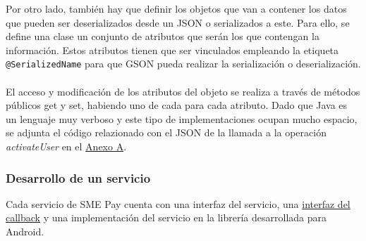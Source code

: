 \documentclass[a4paper, 12pt]{article}
\begin{document}
\bigbreak
Por otro lado, también hay que definir los objetos que van a contener los datos que pueden ser deserializados desde un JSON o serializados a este. Para ello, se define una clase un conjunto de atributos
que serán los que contengan la información. Estos atributos tienen que ser vinculados empleando la etiqueta \verb~@SerializedName~ para que GSON pueda realizar la serialización
o deserialización.
\\
\\
El acceso y modificación de los atributos del objeto se realiza a través de métodos públicos get y set, habiendo uno de cada para cada atributo. Dado que Java es un lenguaje muy verboso y este tipo de implementaciones
ocupan mucho espacio, se adjunta el código relazionado con el JSON de la llamada a la operación \emph{activateUser} en el \hyperref[code:android-json]{Anexo A}.
\subsubsection{Desarrollo de un servicio}
\label{sec-4-1-3}
Cada servicio de SME Pay cuenta con una interfaz del servicio, una \hyperref[code:androidcallback]{interfaz del callback} y una implementación del servicio en la librería desarrollada para Android.
\end{document}
